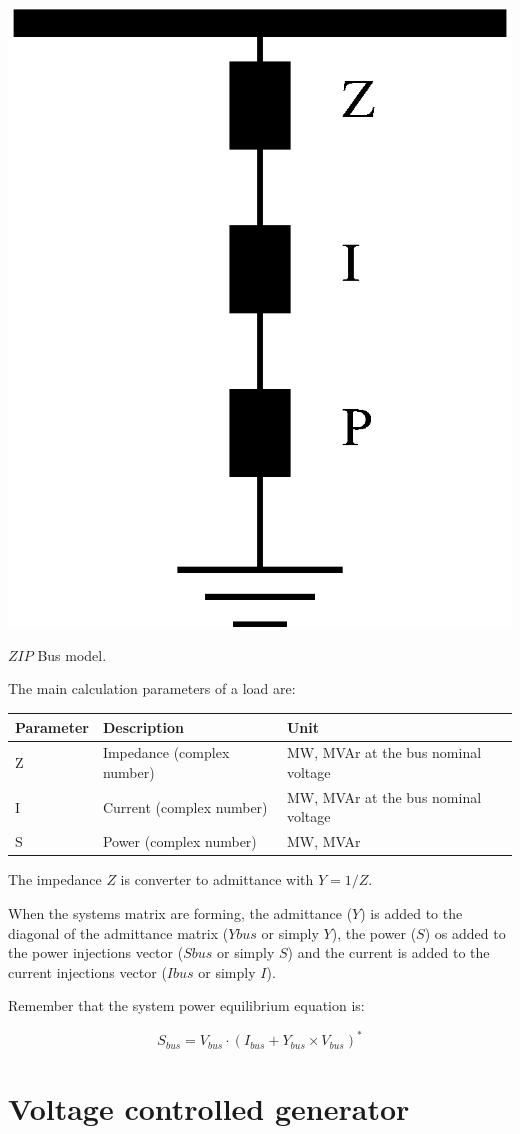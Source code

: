 \documentclass[a4paper,twoside,fleqn]{tufte-book}
\begin{document}
\begin{marginfigure}
	\includegraphics[width=0.49\linewidth]{img/ZIP_model.eps}
	\caption{$ZIP$ Bus model.}
	\label{zip_bus_model}
\end{marginfigure}

The main calculation parameters of a load are:\\
\begin{tabular}{|l|p{3cm}|p{4cm}|}
	\hline 
	Parameter & Description & Unit \\ 
	\hline 
	Z & Impedance (complex number) & MW, MVAr at the bus nominal voltage \\ 
	\hline 
	I & Current (complex number) & MW, MVAr at the bus nominal voltage \\ 
	\hline 
	S & Power (complex number) & MW, MVAr \\ 
	\hline
\end{tabular} 

\vspace{0.5cm}

The impedance $Z$ is converter to admittance with $Y=1/Z$.

When the systems matrix are forming, the admittance ($Y$) is added to the diagonal of the admittance matrix ($Ybus$ or simply $Y$), the power ($S$) os added to the power injections vector ($Sbus$ or simply $S$) and the current is added to the current injections vector ($Ibus$ or simply $I$).

Remember that the system power equilibrium equation is:

$$
S_{bus} = V_{bus} \cdot (I_{bus} + Y_{bus} \times V_{bus})^*
$$


\section{Voltage controlled generator}
\end{document}

